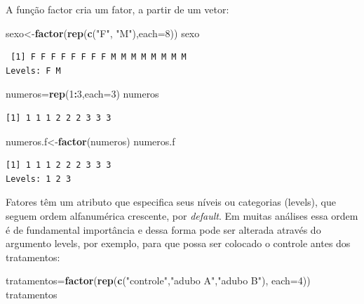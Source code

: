 \documentclass[12pt,brazil,oneside]{book}
\newenvironment{Shaded}{\begin{snugshade}}{\end{snugshade}}
\newcommand{\DataTypeTok}[1]{\textcolor[rgb]{0.13,0.29,0.53}{#1}}
\newcommand{\DecValTok}[1]{\textcolor[rgb]{0.00,0.00,0.81}{#1}}
\newcommand{\KeywordTok}[1]{\textcolor[rgb]{0.13,0.29,0.53}{\textbf{#1}}}
\newcommand{\NormalTok}[1]{#1}
\newcommand{\OperatorTok}[1]{\textcolor[rgb]{0.81,0.36,0.00}{\textbf{#1}}}
\newcommand{\StringTok}[1]{\textcolor[rgb]{0.31,0.60,0.02}{#1}}
\begin{document}
A função factor cria um fator, a partir de um vetor:

\begin{Shaded}
\begin{Highlighting}[]
\NormalTok{sexo<-}\KeywordTok{factor}\NormalTok{(}\KeywordTok{rep}\NormalTok{(}\KeywordTok{c}\NormalTok{(}\StringTok{"F"}\NormalTok{, }\StringTok{"M"}\NormalTok{),}\DataTypeTok{each=}\DecValTok{8}\NormalTok{))}
\NormalTok{sexo}
\end{Highlighting}
\end{Shaded}

\begin{verbatim}
 [1] F F F F F F F F M M M M M M M M
Levels: F M
\end{verbatim}

\begin{Shaded}
\begin{Highlighting}[]
\NormalTok{numeros=}\KeywordTok{rep}\NormalTok{(}\DecValTok{1}\OperatorTok{:}\DecValTok{3}\NormalTok{,}\DataTypeTok{each=}\DecValTok{3}\NormalTok{)}
\NormalTok{numeros}
\end{Highlighting}
\end{Shaded}

\begin{verbatim}
[1] 1 1 1 2 2 2 3 3 3
\end{verbatim}

\begin{Shaded}
\begin{Highlighting}[]
\NormalTok{numeros.f<-}\KeywordTok{factor}\NormalTok{(numeros)}
\NormalTok{numeros.f}
\end{Highlighting}
\end{Shaded}

\begin{verbatim}
[1] 1 1 1 2 2 2 3 3 3
Levels: 1 2 3
\end{verbatim}

Fatores têm um atributo que especifica seus níveis ou categorias
(levels), que seguem ordem alfanumérica crescente, por \emph{default}.
Em muitas análises essa ordem é de fundamental importância e dessa forma
pode ser alterada através do argumento levels, por exemplo, para que
possa ser colocado o controle antes dos tratamentos:

\begin{Shaded}
\begin{Highlighting}[]
\NormalTok{tratamentos=}\KeywordTok{factor}\NormalTok{(}\KeywordTok{rep}\NormalTok{(}\KeywordTok{c}\NormalTok{(}\StringTok{"controle"}\NormalTok{,}\StringTok{"adubo A"}\NormalTok{,}\StringTok{"adubo B"}\NormalTok{), }\DataTypeTok{each=}\DecValTok{4}\NormalTok{))}
\NormalTok{tratamentos}
\end{Highlighting}
\end{Shaded}
\end{document}
